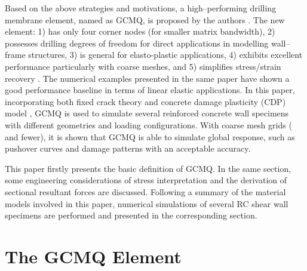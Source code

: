\documentclass[3p,review,sort&compress,11pt,fleqn]{elsarticle}
\begin{document}
Based on the above strategies and motivations, a high--performing drilling membrane element, named as GCMQ, is proposed by the authors \citep{Chang2019}. The new element: 1) has only four corner nodes (for smaller matrix bandwidth), 2) possesses drilling degrees of freedom for direct applications in modelling wall--frame structures, 3) is general for elasto-plastic applications, 4) exhibits excellent performance particularly with coarse meshes, and 5) simplifies stress/strain recovery \citep{Chang2019}. The numerical examples presented in the same paper have shown a good performance baseline in terms of linear elastic applications. In this paper, incorporating both fixed crack theory and concrete damage plasticity (CDP) model \citep{Lee1998}, GCMQ is used to simulate several reinforced concrete wall specimens with different geometries and loading configurations. With coarse mesh grids ( and fewer), it is shown that GCMQ is able to simulate global response, such as pushover curves and damage patterns with an acceptable accuracy.

This paper firstly presents the basic definition of GCMQ. In the same section, some engineering considerations of stress interpretation and the derivation of sectional resultant forces are discussed. Following a summary of the material models involved in this paper, numerical simulations of several RC shear wall specimens are performed and presented in the corresponding section.
\section{The GCMQ Element}
\end{document}
